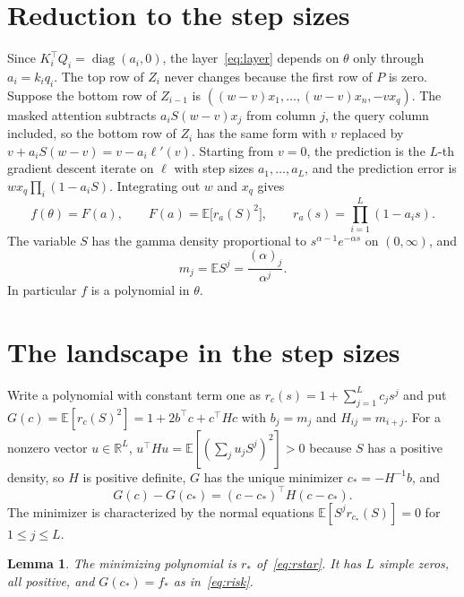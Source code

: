 \documentclass[11pt]{amsart}
\newtheorem{lemma}[theorem]{Lemma}
\theoremstyle{remark}
\numberwithin{equation}{section}
\newcommand{\EE}{\mathbb{E}}
\newcommand{\RR}{\mathbb{R}}
\begin{document}
\section{Reduction to the step sizes}\label{sec:reduction}
Since $K_i^{\top}Q_i=\operatorname{diag}(a_i,0)$, the layer~\eqref{eq:layer} depends on $\theta$ only through $a_i=k_iq_i$. The top row of $Z_i$ never changes because the first row of $P$ is zero. Suppose the bottom row of $Z_{i-1}$ is $((w-v)x_1,\dots,(w-v)x_n,-vx_q)$. The masked attention subtracts $a_iS(w-v)x_j$ from column $j$, the query column included, so the bottom row of $Z_i$ has the same form with $v$ replaced by $v+a_iS(w-v)=v-a_i\ell'(v)$. Starting from $v=0$, the prediction is the $L$-th gradient descent iterate on $\ell$ with step sizes $a_1,\dots,a_L$, and the prediction error is $wx_q\prod_i(1-a_iS)$. Integrating out $w$ and $x_q$ gives
\begin{equation}\label{eq:F}
f(\theta)=F(a),\qquad F(a)=\EE\bigl[r_a(S)^2\bigr],\qquad r_a(s)=\prod_{i=1}^{L}(1-a_is).
\end{equation}
The variable $S$ has the gamma density proportional to $s^{\alpha-1}e^{-\alpha s}$ on $(0,\infty)$, and
\begin{equation}\label{eq:moments}
m_j=\EE S^j=\frac{(\alpha)_j}{\alpha^j}.
\end{equation}
In particular $f$ is a polynomial in $\theta$.

\section{The landscape in the step sizes}\label{sec:products}
Write a polynomial with constant term one as $r_c(s)=1+\sum_{j=1}^{L}c_js^j$ and put $G(c)=\EE[r_c(S)^2]=1+2b^{\top}c+c^{\top}Hc$ with $b_j=m_j$ and $H_{ij}=m_{i+j}$. For a nonzero vector $u\in\RR^L$, $u^{\top}Hu=\EE[(\sum_ju_jS^j)^2]>0$ because $S$ has a positive density, so $H$ is positive definite, $G$ has the unique minimizer $c_*=-H^{-1}b$, and
\begin{equation}\label{eq:quadratic}
G(c)-G(c_*)=(c-c_*)^{\top}H(c-c_*).
\end{equation}
The minimizer is characterized by the normal equations $\EE[S^jr_{c_*}(S)]=0$ for $1\le j\le L$.

\begin{lemma}\label{lem:laguerre}
The minimizing polynomial is $r_*$ of~\eqref{eq:rstar}. It has $L$ simple zeros, all positive, and $G(c_*)=f_*$ as in~\eqref{eq:risk}.
\end{lemma}
\end{document}

